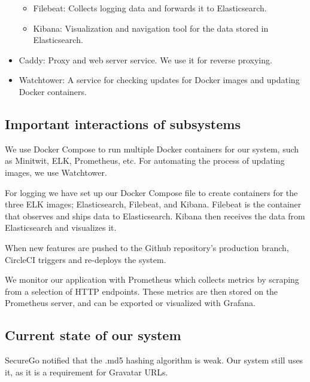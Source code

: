 \begin{itemize}
\begin{itemize}
        \item Filebeat: Collects logging data and forwards it to Elasticsearch.
        \vspace{0.5em}
        \item Kibana: Visualization and navigation tool for the data stored in Elasticsearch. 
        \vspace{0.5em}
    \end{itemize}
    \item Caddy: Proxy and web server service. We use it for reverse proxying.
    \vspace{0.5em}
    \item Watchtower: A service for checking updates for Docker images and updating Docker containers.
\end{itemize}

\subsection{Important interactions of subsystems}
We use Docker Compose to run multiple Docker containers for our system, such as Minitwit, ELK, Prometheus, etc. For automating the process of updating images, we use Watchtower. 


For logging we have set up our Docker Compose file to create containers for the three ELK images; Elasticsearch, Filebeat, and Kibana. Filebeat is the container that observes and ships data to Elasticsearch. Kibana then receives the data from Elasticsearch and visualizes it.  


When new features are pushed to the Github repository's production branch, CircleCI triggers and re-deploys the system. 


We monitor our application with Prometheus which collects metrics by scraping from a selection of HTTP endpoints. These metrics are then stored on the Prometheus server, and can be exported or visualized with Grafana.

\subsection{Current state of our system}
SecureGo notified that the .md5 hashing algorithm is weak. Our system still uses it, as it is a requirement for Gravatar URLs.

